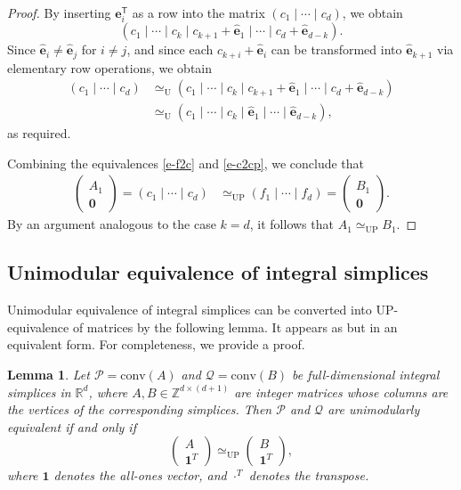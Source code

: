 \documentclass[reqno, 12pt]{article}
\newtheorem{lem}[thm]{Lemma}
\theoremstyle{mydefinition}
\theoremstyle{myremark}
\numberwithin{algorithm}{section}
\begin{document}
\begin{proof}
By inserting $\mathbf{e}_i^\mathsf{T}$ as a row into the matrix $(c_1 \mid \cdots \mid c_d)$, we obtain
\[
(c_1 \mid \cdots \mid c_k \mid c_{k+1} + \widehat{\mathbf{e}}_1 \mid \cdots \mid c_d + \widehat{\mathbf{e}}_{d-k}).
\]
Since $\widehat{\mathbf{e}}_i \neq \widehat{\mathbf{e}}_j$ for $i \neq j$, and since each $c_{k+i} + \widehat{\mathbf{e}}_i$ can be transformed into $\widehat{\mathbf{e}}_{k+1}$ via elementary row operations, we obtain
\begin{align*}
(c_1 \mid \cdots \mid c_d) &\simeq_{\mathrm{U}} (c_1 \mid \cdots \mid c_k \mid c_{k+1} + \widehat{\mathbf{e}}_1 \mid \cdots \mid c_d + \widehat{\mathbf{e}}_{d-k}) \\
&\simeq_{\mathrm{U}} (c_1 \mid \cdots \mid c_k \mid \widehat{\mathbf{e}}_1 \mid \cdots \mid \widehat{\mathbf{e}}_{d-k}),
\end{align*}
as required.

Combining the equivalences \eqref{e-f2c} and \eqref{e-c2cp}, we conclude that
\begin{align}
\label{e-cf}
\begin{pmatrix} A_1 \\ \mathbf{0} \end{pmatrix}
= (c_1 \mid \cdots \mid c_d) &\simeq_{\mathrm{UP}} (f_1 \mid \cdots \mid f_d) = \begin{pmatrix} B_1 \\ \mathbf{0} \end{pmatrix}.
\end{align}
By an argument analogous to the case $k = d$, it follows that $A_1 \simeq_{\mathrm{UP}} B_1$.
\end{proof}

\subsection{Unimodular equivalence of integral simplices}

Unimodular equivalence of integral simplices can be converted into UP-equivalence of matrices by the following lemma. It appears as \cite[Proposition 3.9]{Abney-Mcpeek} but in an equivalent form. For completeness, we provide a proof.
\begin{lem}\label{UEcone}
Let $\mathcal{P} = \mathrm{conv}(A)$ and $\mathcal{Q} = \mathrm{conv}(B)$ be  full-dimensional integral simplices in $\mathbb{R}^d$, where $A, B \in \mathbb{Z}^{d \times (d+1)}$ are integer matrices whose columns are the vertices of the corresponding simplices.
Then $\mathcal{P}$ and $\mathcal{Q}$ are unimodularly equivalent if and only if
\[
\begin{pmatrix}
    A \\
    \mathbf{1}^T
\end{pmatrix}
\simeq_{\mathrm{UP}}
\begin{pmatrix}
    B \\
    \mathbf{1}^T
\end{pmatrix},
\]
where $\mathbf{1}$ denotes the all-ones vector,  and $\cdot^T$ denotes the transpose.
\end{lem}
\end{document}
